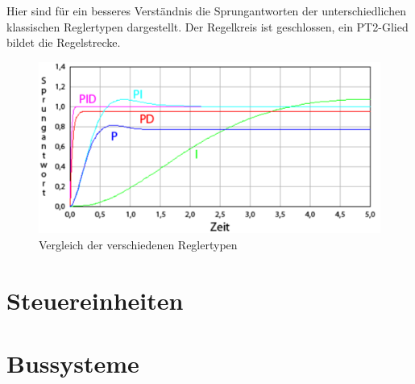 \vspace{5mm}
Hier sind für ein besseres Verständnis die Sprungantworten der unterschiedlichen klassischen Reglertypen dargestellt. Der Regelkreis ist geschlossen, ein PT2-Glied bildet die Regelstrecke.
\\[4mm]
\begin{figure}[H]
	\begin{center}
		\includegraphics[scale=0.3]{figures/antrieb/Reglertypen.png}
		\caption{Vergleich der verschiedenen Reglertypen\cite{PID-Regler}}
	\end{center}
\end{figure}

\newpage


\section{Steuereinheiten}
\section{Bussysteme}
